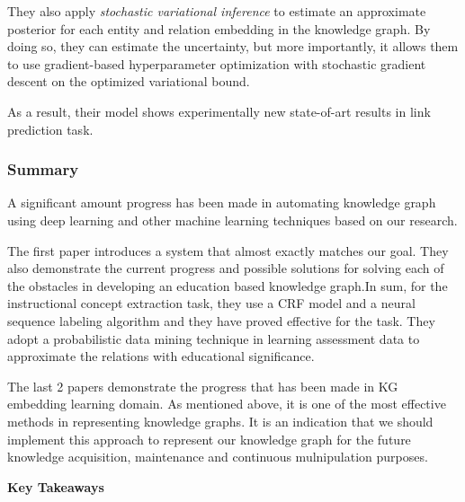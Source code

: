 \documentclass{acm_proc_article-sp}
\renewcommand{\paragraph}[1]{\vskip 6pt\noindent\textbf{#1 }}
\begin{document}
They also apply \emph{stochastic variational inference} to estimate an
approximate posterior for each entity and relation embedding in the
knowledge graph. By doing so, they can estimate the uncertainty, but
more importantly, it allows them to use gradient-based hyperparameter
optimization with stochastic gradient descent on the optimized
variational bound.

As a result, their model shows experimentally new state-of-art results
in link prediction task.

\subsubsection{Summary}\label{summary-4}

A significant amount progress has been made in automating knowledge
graph using deep learning and other machine learning techniques based on
our research.

The first paper introduces a system that almost exactly matches our
goal. They also demonstrate the current progress and possible solutions
for solving each of the obstacles in developing an education based
knowledge graph.In sum, for the instructional concept extraction task,
they use a CRF model and a neural sequence labeling algorithm and they
have proved effective for the task. They adopt a probabilistic data
mining technique in learning assessment data to approximate the
relations with educational significance.

The last 2 papers demonstrate the progress that has been made in KG
embedding learning domain. As mentioned above, it is one of the most
effective methods in representing knowledge graphs. It is an indication
that we should implement this approach to represent our knowledge graph
for the future knowledge acquisition, maintenance and continuous
mulnipulation purposes.

\paragraph{Key Takeaways}\label{key-takeaways}
\end{document}
